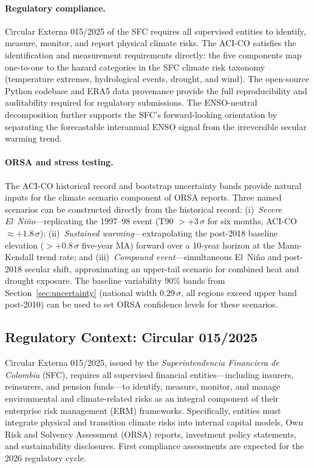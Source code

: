 \documentclass[12pt]{article}
\begin{document}
\paragraph{Regulatory compliance.} Circular Externa 015/2025 of the SFC requires all supervised entities to identify, measure, monitor, and report physical climate risks. The ACI-CO satisfies the identification and measurement requirements directly: the five components map one-to-one to the hazard categories in the SFC climate risk taxonomy (temperature extremes, hydrological events, drought, and wind). The open-source Python codebase and ERA5 data provenance provide the full reproducibility and auditability required for regulatory submissions. The ENSO-neutral decomposition further supports the SFC's forward-looking orientation by separating the forecastable interannual ENSO signal from the irreversible secular warming trend.

\paragraph{ORSA and stress testing.} The ACI-CO historical record and bootstrap uncertainty bands provide natural inputs for the climate scenario component of ORSA reports. Three named scenarios can be constructed directly from the historical record: (i)~\emph{Severe El~Ni\~no}---replicating the 1997--98 event (T90 $>+3\,\sigma$ for six months, ACI-CO $\approx +1.8\,\sigma$); (ii)~\emph{Sustained warming}---extrapolating the post-2018 baseline elevation ($>+0.8\,\sigma$ five-year MA) forward over a 10-year horizon at the Mann-Kendall trend rate; and (iii)~\emph{Compound event}---simultaneous El~Ni\~no and post-2018 secular shift, approximating an upper-tail scenario for combined heat and drought exposure. The baseline variability 90\% bands from Section~\ref{sec:uncertainty} (national width $0.29\,\sigma$, all regions exceed upper band post-2010) can be used to set ORSA confidence levels for these scenarios.
 
\subsection{Regulatory Context: Circular 015/2025}
 
Circular Externa 015/2025, issued by the \emph{Superintendencia Financiera de
Colombia} (SFC), requires all supervised financial entities---including insurers,
reinsurers, and pension funds---to identify, measure, monitor, and manage
environmental and climate-related risks as an integral component of their
enterprise risk management (ERM) frameworks. Specifically, entities must
integrate physical and transition climate risks into internal capital models,
Own Risk and Solvency Assessment (ORSA) reports, investment policy statements,
and sustainability disclosures. First compliance assessments are expected for
the 2026 regulatory cycle.
\end{document}
